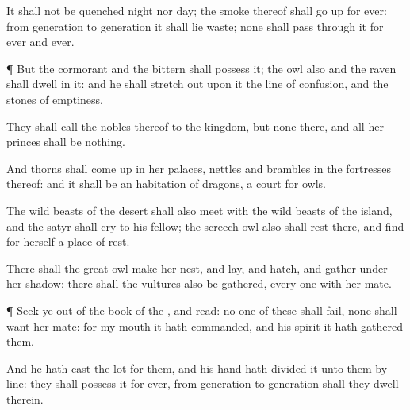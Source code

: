 {It shall not be
quenched
night nor
day; the
smoke thereof shall go
up for
ever: from
generation to
generation it shall lie
waste; none shall pass
through it for
ever and
ever.


\par }{\PP {}¶ But the
cormorant and the
bittern shall
possess it; the
owl also and the
raven shall
dwell in it: and he shall stretch
out upon it the
line of
confusion, and the
stones of
emptiness.

They shall
call the
nobles thereof to the
kingdom, but none
{} there, and all her
princes shall be
nothing.

And
thorns shall come
up in her
palaces,
nettles and
brambles in the
fortresses thereof: and it shall be an
habitation of
dragons,
{} a
court for
owls.

The wild beasts of the
desert shall also
meet with the wild beasts of the
island, and the
satyr shall
cry to his
fellow; the screech
owl also shall
rest there, and
find for herself a place of
rest.

There shall the great
owl make her
nest, and
lay, and
hatch, and
gather under her
shadow: there shall the
vultures also be
gathered, every
one with her
mate.


\par }{\PP {}¶ Seek ye
out of the
book of the
{}, and
read: no
one of
these shall
fail,
none shall
want her
mate: for my
mouth it hath
commanded, and his
spirit it hath
gathered them.

And he hath
cast the
lot for them, and his
hand hath
divided it unto them by
line: they shall
possess it
for
ever, from
generation to
generation shall they
dwell therein.




\par }
